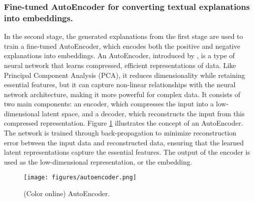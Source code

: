  


\subsubsection{Fine-tuned AutoEncoder for converting textual explanations into embeddings.}
\label{sec:framework_explanation_generator_autoencoder}

In the second stage, the generated explanations from the first stage are used to train a fine-tuned AutoEncoder, which encodes both the positive and negative explanations into embeddings. An AutoEncoder, introduced by \citet{hinton2006reducing}, is a type of neural network that learns compressed, efficient representations of data. Like Principal Component Analysis (PCA), it reduces dimensionality while retaining essential features, but it can capture non-linear relationships with the neural network architecture, making it more powerful for complex data. It consists of two main components: an encoder, which compresses the input into a low-dimensional latent space, and a decoder, which reconstructs the input from this compressed representation. Figure \ref{fig:autoencoder} illustrates the concept of an AutoEncoder. The network is trained through back-propagation to minimize reconstruction error between the input data and reconstructed data, ensuring that the learned latent representations capture the essential features. The output of the encoder is used as the low-dimensional representation, or the embedding.

\begin{figure}[hbtp!]
    \centering
    \texttt{[image: figures/autoencoder.png]}
    \caption{(Color online) AutoEncoder.}\label{fig:autoencoder}
\end{figure}

